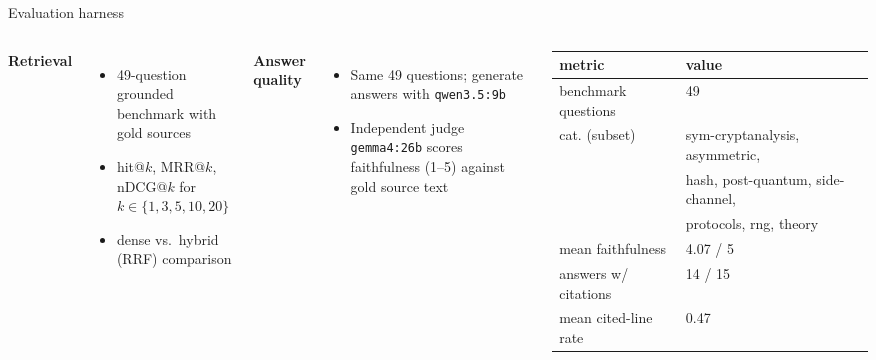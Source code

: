 \documentclass[aspectratio=169]{beamer}
\begin{document}
\begin{frame}{Evaluation harness}
  \begin{columns}[t, totalwidth=\linewidth]
      \textbf{Retrieval}\\[2pt]
      \begin{itemize}
        \item 49-question grounded benchmark with gold sources
        \item hit@$k$, MRR@$k$, nDCG@$k$ for $k \in \{1,3,5,10,20\}$
        \item dense vs.\ hybrid (RRF) comparison
      \end{itemize}
      \vspace{2mm}
      \textbf{Answer quality}\\[2pt]
      \begin{itemize}
        \item Same 49 questions; generate answers with \texttt{qwen3.5:9b}
        \item Independent judge \texttt{gemma4:26b} scores faithfulness (1--5)
          against gold source text
      \end{itemize}
      \scriptsize
      \begin{tabular}{@{}ll@{}}
        \toprule
        \textbf{metric} & \textbf{value} \\
        \midrule
        benchmark questions & 49 \\
        cat. (subset) & sym-cryptanalysis, asymmetric,\\
                      & hash, post-quantum, side-channel,\\
                      & protocols, rng, theory \\
        mean faithfulness & 4.07 / 5 \\
        answers w/ citations & 14 / 15 \\
        mean cited-line rate & 0.47 \\
        \bottomrule
      \end{tabular}
  \end{columns}
\end{frame}
\end{document}
